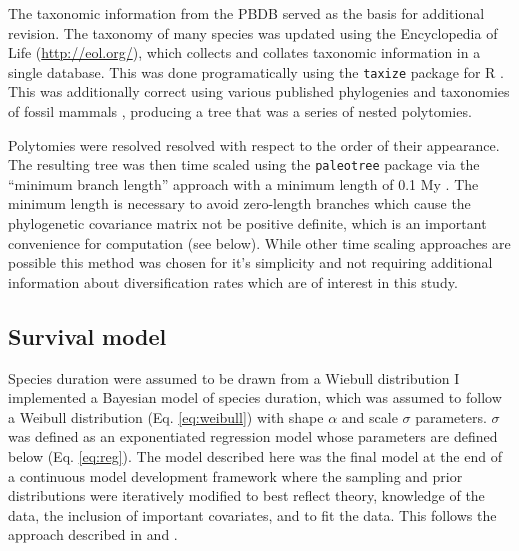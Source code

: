 \documentclass[12pt,letterpaper]{article}
\begin{document}
The taxonomic information from the PBDB served as the basis for additional revision. The taxonomy of many species was updated using the Encyclopedia of Life (\url{http://eol.org/}), which collects and collates taxonomic information in a single database. This was done programatically using the \texttt{taxize} package for R \citep{2013taxize}. This was additionally correct using various published phylogenies and taxonomies of fossil mammals \citep{Raia2012f,Janis1998,Janis2008}, producing a tree that was a series of nested polytomies. 

Polytomies were resolved resolved with respect to the order of their appearance. The resulting tree was then time scaled using the \texttt{paleotree} package via the ``minimum branch length'' approach with a minimum length of 0.1 My \citep{Bapst2012a}. The minimum length is necessary to avoid zero-length branches which cause the phylogenetic covariance matrix not be positive definite, which is an important convenience for computation (see below). While other time scaling approaches are possible \citep{Bapst2013a,Hedman2010} this method was chosen for it's simplicity and not requiring additional information about diversification rates which are of interest in this study. 



\subsection{Survival model}

Species duration were assumed to be drawn from a Wiebull distribution
I implemented a Bayesian model of species duration, which was assumed to follow a Weibull distribution (Eq. \ref{eq:weibull}) with shape \(\alpha\) and scale \(\sigma\) parameters. \(\sigma\) was defined as an exponentiated regression model whose parameters are defined below (Eq. \ref{eq:reg}). The model described here was the final model at the end of a continuous model development framework where the sampling and prior distributions were iteratively modified to best reflect theory, knowledge of the data, the inclusion of important covariates, and to fit the data. This follows the approach described in \citet{Gelman2007} and \citet{Gelman2013d}.
\end{document}
